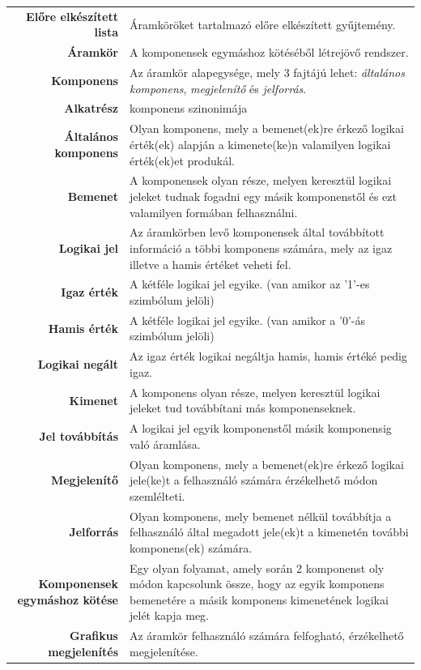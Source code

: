 \begin{longtable}{r p{10.95cm}}
\textbf{Előre elkészített lista} & Áramköröket tartalmazó előre elkészített gyűjtemény. \\
\textbf{Áramkör} & A komponensek egymáshoz kötéséből létrejövő rendszer. \\
\textbf{Komponens} & Az áramkör alapegysége, mely 3 fajtájú lehet: \emph{általános komponens}, \emph{megjelenítő} és \emph{jelforrás}. \\
\textbf{Alkatrész} & komponens szinonimája\\
\textbf{Általános komponens} & Olyan komponens, mely a bemenet(ek)re érkező logikai érték(ek) alapján a kimenete(ke)n valamilyen logikai érték(ek)et produkál.\\
\textbf{Bemenet} & A komponensek olyan része, melyen keresztül logikai jeleket tudnak fogadni egy másik komponenstől és ezt valamilyen formában felhasználni. \\
\textbf{Logikai jel} & Az áramkörben levő komponensek által továbbított információ a többi komponens számára, mely az igaz illetve a hamis értéket veheti fel.\\
\textbf{Igaz érték} & A kétféle logikai jel egyike. (van amikor az '1'-es szimbólum jelöli)\\
\textbf{Hamis érték} & A kétféle logikai jel egyike. (van amikor a '0'-ás szimbólum jelöli)\\
\textbf{Logikai negált} & Az igaz érték logikai negáltja hamis, hamis értéké pedig igaz.\\
\textbf{Kimenet} & A komponens olyan része, melyen keresztül logikai jeleket tud továbbítani más komponenseknek.\\
\textbf{Jel továbbítás} & A logikai jel egyik komponenstől másik komponensig való áramlása.\\
\textbf{Megjelenítő} & Olyan komponens, mely a bemenet(ek)re érkező logikai jele(ke)t a felhasználó számára érzékelhető módon szemlélteti.\\
\textbf{Jelforrás} & Olyan komponens, mely bemenet nélkül továbbítja a felhasználó által megadott jele(ek)t a kimenetén további komponens(ek) számára. \\
\textbf{Komponensek egymáshoz kötése} & Egy olyan folyamat, amely során 2 komponenst oly módon kapcso\-lunk össze, hogy az egyik komponens bemenetére a másik komponens kimenetének logikai jelét kapja meg.\\
\textbf{Grafikus megjelenítés} & Az áramkör felhasználó számára felfogható, érzékelhető megjelenítése.\\

\end{longtable}
